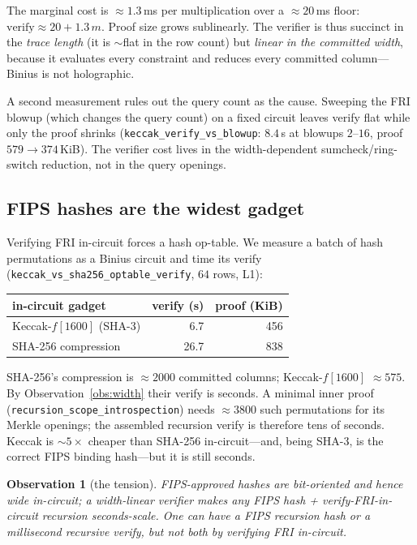 \documentclass[11pt]{article}
\newtheorem{observation}{Observation}
\begin{document}
The marginal cost is $\approx1.3$\,ms per multiplication over a $\approx20$\,ms
floor: $\text{verify}\approx 20 + 1.3\,m$. Proof size grows sublinearly. The
verifier is thus succinct in the \emph{trace length} (it is $\sim$flat in the
row count) but \emph{linear in the committed width}, because it evaluates every
constraint and reduces every committed column---Binius is not holographic.

A second measurement rules out the query count as the cause. Sweeping the FRI
blowup (which changes the query count) on a fixed circuit leaves verify flat while
only the proof shrinks (\texttt{keccak\_verify\_vs\_blowup}: $8.4$\,s at blowups
$2$--$16$, proof $579\!\to\!374$\,KiB). The verifier cost lives in the
width-dependent sumcheck/ring-switch reduction, not in the query openings.

\subsection{FIPS hashes are the widest gadget}

Verifying FRI in-circuit forces a hash op-table. We measure a batch of hash
permutations as a Binius circuit and time its verify
(\texttt{keccak\_vs\_sha256\_optable\_verify}, $64$ rows, L1):

\begin{center}
\begin{tabular}{lrr}
\toprule
in-circuit gadget & verify (s) & proof (KiB)\\
\midrule
Keccak-$f[1600]$ (SHA-3) & 6.7 & 456\\
SHA-256 compression      & 26.7 & 838\\
\bottomrule
\end{tabular}
\end{center}

SHA-256's compression is $\approx2000$ committed columns; Keccak-$f[1600]$
$\approx575$. By Observation~\ref{obs:width} their verify is seconds. A minimal
inner proof (\texttt{recursion\_scope\_introspection}) needs $\approx3800$ such
permutations for its Merkle openings; the assembled recursion verify is therefore
tens of seconds. Keccak is $\sim5\times$ cheaper than SHA-256 in-circuit---and,
being SHA-3, is the correct FIPS binding hash---but it is still seconds.

\begin{observation}[the tension]\label{obs:tension}
FIPS-approved hashes are bit-oriented and hence wide in-circuit; a width-linear
verifier makes any FIPS hash + verify-FRI-in-circuit recursion seconds-scale.
One can have a FIPS recursion hash or a millisecond recursive verify, but not
both by verifying FRI in-circuit.
\end{observation}
\end{document}
